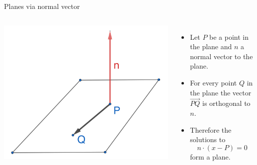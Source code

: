 \documentclass{beamer}
\begin{document}
\begin{frame}{Planes via normal vector}
  \begin{columns}
    \hspace{-1cm}
    \includegraphics[scale=1]{normal-to-plane.png}
    \begin{itemize}
    \item Let $P$ be a point in the plane and $n$ a normal vector to the plane.
    \item For every point $Q$ in the plane the vector $\overrightarrow {PQ}$ is orthogonal to $n$.
    \item Therefore the solutions to
      \begin{equation*}
        n\cdot (x-P) = 0
      \end{equation*}
      form a plane.
    \end{itemize}
  \end{columns}
\end{frame}
\end{document}
